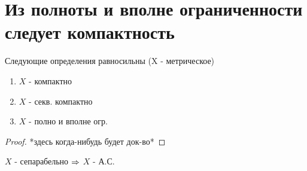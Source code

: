 \documentclass[geometry.tex]{subfiles}
\begin{document}
  \section{Из полноты и вполне ограниченности следует компактность}

  \begin{theorem}
      Следующие определения равносильны (X - метрическое)
      \begin{enumerate}
          \item $X$ - компактно
          \item $X$ - секв. компактно
          \item $X$ - полно и вполне огр.
      \end{enumerate}
  \end{theorem}

  \begin{proof}
      *здесь когда-нибудь будет док-во*
  \end{proof}

  \begin{theorem}
      $X$ - сепарабельно $\Rightarrow$ $X$ -  А.С.
  \end{theorem}
\end{document}
